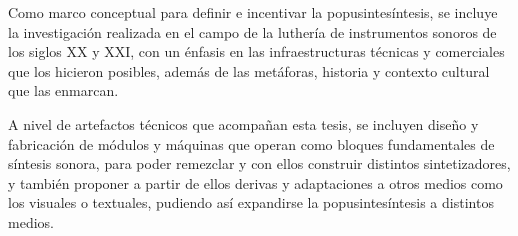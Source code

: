 \documentclass[../candidatura.tex]{subfiles}
\begin{document}
Como marco conceptual para definir e incentivar la popusintesíntesis, se incluye la investigación realizada en el campo de la luthería de instrumentos sonoros de los siglos XX y XXI, con un énfasis en las infraestructuras técnicas y comerciales que los hicieron posibles, además de las metáforas, historia y contexto cultural que las enmarcan.

A nivel de artefactos técnicos que acompañan esta tesis, se incluyen diseño y fabricación de módulos y máquinas que operan como bloques fundamentales de síntesis sonora, para poder remezclar y con ellos construir distintos sintetizadores, y también proponer a partir de ellos derivas y adaptaciones a otros medios como los visuales o textuales, pudiendo así expandirse la popusintesíntesis a distintos medios.

\end{document}
